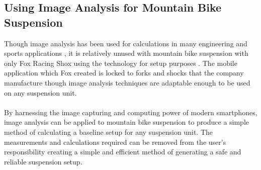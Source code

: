 \subsection{Using Image Analysis for Mountain Bike Suspension}
Though image analysis has been used for calculations in many engineering and sports applications \citep{concreteanalysis, bridgecables}, it is relatively unused with mountain bike suspension with only Fox Racing Shox using the technology for setup purposes \citep{foxird}. The mobile application which Fox created is locked to \glspl{fork} and \glspl{shock} that the company manufacture though image analysis techniques are adaptable enough to be used on any suspension unit.
\\\\
By harnessing the image capturing and computing power of modern smartphones, image analysis can be applied to mountain bike suspension to produce a simple method of calculating a baseline setup for any suspension unit. The measurements and calculations required can be removed from the user's responsibility creating a simple and efficient method of generating a safe and reliable suspension setup.